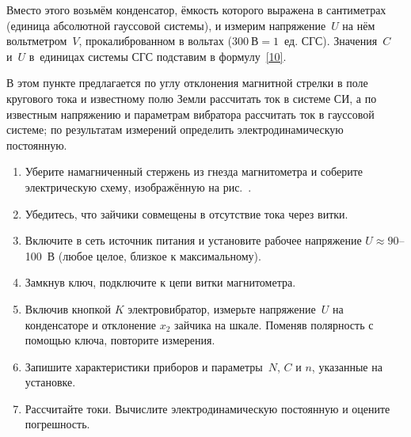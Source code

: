 Вместо этого возьмём конденсатор, ёмкость которого выражена в сантиметрах (единица абсолютной гауссовой системы), и
измерим напряжение~$U$ на нём вольтметром~$V$, прокалиброванном в вольтах ($300~\text{В} = 1$~ед. СГС). Значения~$C$ и~$U$
в~единицах системы СГС подставим в формулу~\eqref{10}.

\begin{lab:task}

    В этом пункте предлагается по углу отклонения магнитной стрелки в поле кругового тока и известному полю Земли рассчитать
    ток в системе СИ, а по известным напряжению и параметрам вибратора рассчитать ток в гауссовой системе; по результатам
    измерений определить электродинамическую постоянную.

    \begin{enumerate}
        \item Уберите намагниченный стержень из гнезда магнитометра и соберите электрическую схему, изображённую на рис.~.

        \item Убедитесь, что зайчики совмещены в отсутствие тока через витки.

        \item Включите в сеть источник питания и установите рабочее напряжение $U\approx 90$--100~В (любое целое, близкое к
        максимальному).

        \item Замкнув ключ, подключите к цепи витки магнитометра.

        \item Включив кнопкой $K$ электровибратор, измерьте напряжение~$U$ на конденсаторе и отклонение $x_2$ зайчика на шкале.
        Поменяв полярность с помощью ключа, повторите измерения.

        \item Запишите характеристики приборов и параметры~$N$, $C$ и $n$, указанные на установке.

        \item Рассчитайте токи. Вычислите электродинамическую постоянную и оцените погрешность.
    \end{enumerate}


\end{lab:task}


